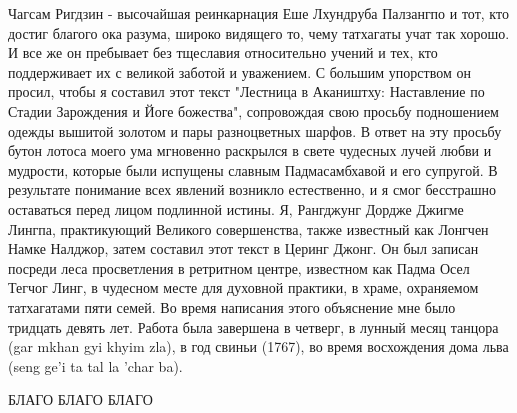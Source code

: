 \small
Чагсам Ригдзин - высочайшая реинкарнация Еше Лхундруба Палзангпо и тот, кто
достиг благого ока разума, широко видящего то, чему татхагаты учат так хорошо. И все же
он пребывает без тщеславия относительно учений и тех, кто поддерживает их с великой
заботой и уважением. С большим упорством он просил, чтобы я составил этот текст
"Лестница в Акаништху: Наставление по Стадии Зарождения и Йоге божества", сопровождая
свою просьбу подношением одежды вышитой золотом и пары разноцветных шарфов.
В ответ на эту просьбу бутон лотоса моего ума мгновенно раскрылся в свете чудесных
лучей любви и мудрости, которые были испущены славным Падмасамбхавой и его супругой.
В результате понимание всех явлений возникло естественно, и я смог бесстрашно оставаться
перед лицом подлинной истины. Я, Рангджунг Дордже Джигме Лингпа, практикующий
Великого совершенства, также известный как Лонгчен Намке Налджор, затем составил этот
текст в Церинг Джонг. Он был записан посреди леса просветления в ретритном центре,
известном как Падма Осел Тегчог Линг, в чудесном месте для духовной практики, в храме,
охраняемом татхагатами пяти семей. Во время написания этого объяснение мне было
тридцать девять лет. Работа была завершена в четверг, в лунный месяц танцора (gar mkhan
gyi khyim zla), в год свиньи (1767), во время восхождения дома льва (seng ge'i ta tal la 'char
ba).

\begin{center}
БЛАГО БЛАГО БЛАГО
\end{center}

